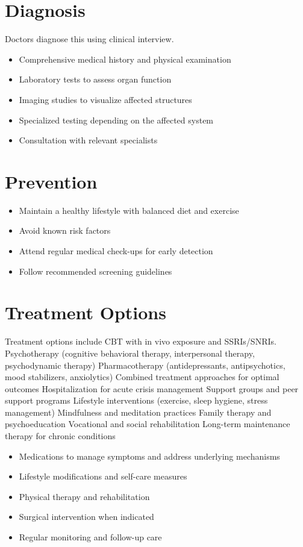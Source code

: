 \section{Diagnosis}
Doctors diagnose this using clinical interview.

\begin{itemize}[noitemsep]
  \item Comprehensive medical history and physical examination
  \item Laboratory tests to assess organ function
  \item Imaging studies to visualize affected structures
  \item Specialized testing depending on the affected system
  \item Consultation with relevant specialists
\end{itemize}
\section{Prevention}
\begin{itemize}[noitemsep]
  \item Maintain a healthy lifestyle with balanced diet and exercise
  \item Avoid known risk factors
  \item Attend regular medical check-ups for early detection
  \item Follow recommended screening guidelines
\end{itemize}
\section{Treatment Options}
Treatment options include CBT with in vivo exposure and SSRIs/SNRIs. Psychotherapy (cognitive behavioral therapy, interpersonal therapy, psychodynamic therapy) Pharmacotherapy (antidepressants, antipsychotics, mood stabilizers, anxiolytics) Combined treatment approaches for optimal outcomes Hospitalization for acute crisis management Support groups and peer support programs Lifestyle interventions (exercise, sleep hygiene, stress management) Mindfulness and meditation practices Family therapy and psychoeducation Vocational and social rehabilitation Long-term maintenance therapy for chronic conditions

\begin{itemize}[noitemsep]
  \item Medications to manage symptoms and address underlying mechanisms
  \item Lifestyle modifications and self-care measures
  \item Physical therapy and rehabilitation
  \item Surgical intervention when indicated
  \item Regular monitoring and follow-up care
\end{itemize}
